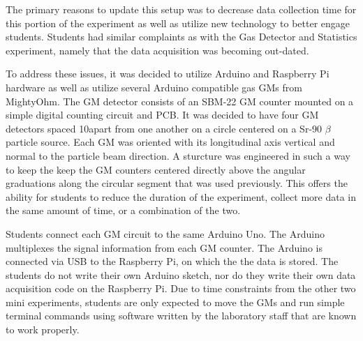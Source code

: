 The primary reasons to update this setup was to decrease data collection time for this portion of the experiment as well as utilize new technology to better engage students.
Students had similar complaints as with the Gas Detector and Statistics experiment, namely that the data acquisition was becoming out-dated.


To address these issues, it was decided to utilize Arduino and Raspberry Pi hardware as well as utilize several Arduino compatible gas GMs from MightyOhm.
The GM detector consists of an SBM-22 GM counter mounted on a simple digital counting circuit and PCB.
It was decided to have four GM detectors spaced 10\textdegree apart from one another on a circle centered on a Sr-90 $\beta$ particle source.
Each GM was oriented with its longitudinal axis vertical and normal to the particle beam direction.
A sturcture was engineered in such a way to keep the keep the GM counters centered directly above the angular graduations along the circular segment that was used previously.
This offers the ability for students to reduce the duration of the experiment, collect more data in the same amount of time, or a combination of the two.


Students connect each GM circuit to the same Arduino Uno.
The Arduino multiplexes the signal information from each GM counter.
The Arduino is connected via USB to the Raspberry Pi, on which the the data is stored.
The students do not write their own Arduino sketch, nor do they write their own data acquisition code on the Raspberry Pi.
Due to time constraints from the other two mini experiments, students are only expected to move the GMs and run simple terminal commands using software written by the laboratory staff that are known to work properly.
